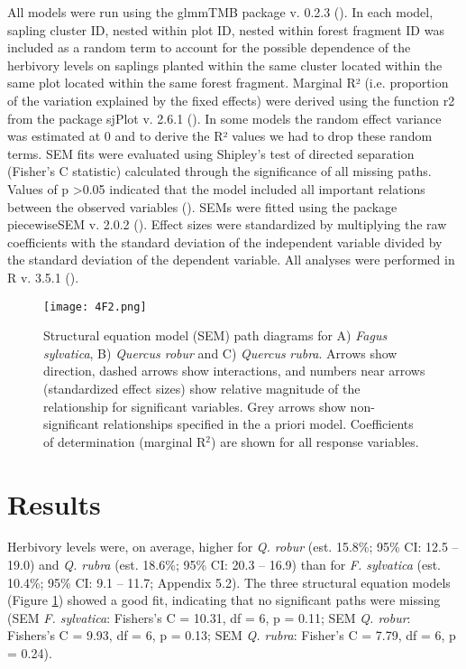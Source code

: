 \documentclass[b5paper,10pt]{book} %
\begin{document}
	All models were run using the glmmTMB package v. 0.2.3 (\citealt{Brooks2017}). In each model, sapling cluster ID, nested within plot ID, nested within forest fragment ID was included as a random term to account for the possible dependence of the herbivory levels on saplings planted within the same cluster located within the same plot located within the same forest fragment. Marginal R² (i.e. proportion of the variation explained by the fixed effects) were derived using the function r2 from the package sjPlot v. 2.6.1 (\citealt{Ludecke2018}). In some models the random effect variance was estimated at 0 and to derive the R² values we had to drop these random terms. SEM fits were evaluated using Shipley’s test of directed separation (Fisher’s C statistic) calculated through the significance of all missing paths. Values of p \textgreater 0.05 indicated that the model included all important relations between the observed variables (\citealt{Shipley2009}). SEMs were fitted using the package piecewiseSEM v. 2.0.2 (\citealt{Lefcheck2016}). Effect sizes were standardized by multiplying the raw coefficients with the standard deviation of the independent variable divided by the standard deviation of the dependent variable. All analyses were performed in R v. 3.5.1 (\citealt{RCoreTeam2018}). 

	\begin{figure}
		\begin{center}
			\texttt{[image: 4F2.png]}
		\end{center}
			\caption{Structural equation model (SEM) path diagrams for A) \textit{Fagus sylvatica}, B) \textit{Quercus robur} and C) \textit{Quercus} \textit{rubra}. Arrows show direction, dashed arrows show interactions, and numbers near arrows (standardized effect sizes) show relative magnitude of the relationship for significant variables. Grey arrows show non-significant relationships specified in the a priori model. Coefficients of determination (marginal R$^{2}$) are shown for all response variables. \label{Fig4.2}}
	\end{figure}

	\section{Results}

	Herbivory levels were, on average, higher for \textit{Q. robur} (est. 15.8\%; 95\% CI: 12.5 -- 19.0) and \textit{Q. rubra} (est. 18.6\%; 95\% CI: 20.3 -- 16.9) than for \textit{F. sylvatica} (est. 10.4\%; 95\% CI: 9.1 -- 11.7; Appendix 5.2). The three structural equation models (Figure \ref{Fig4.2}) showed a good fit, indicating that no significant paths were missing (SEM \textit{F. sylvatica}: Fishers’s C = 10.31, df = 6, p = 0.11; SEM \textit{Q. robur}: Fishers’s C = 9.93, df = 6, p = 0.13; SEM \textit{Q. rubra}: Fisher’s C = 7.79, df = 6, p = 0.24). 
\end{document}
